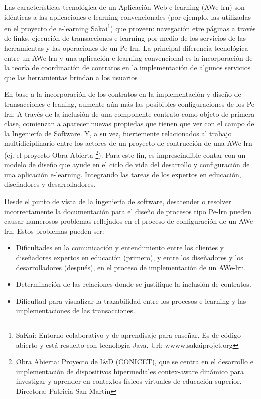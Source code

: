 \documentclass[12 pt,a4paper]{llncs}
\begin{document}
Las características tecnológica de un Aplicación Web e-learning (AWe-lrn) son idénticas a las aplicaciones e-learning convencionales (por ejemplo, las utilizadas en el proyecto de e-learning Sakai\footnote{SaKai: Entorno colaborativo y de aprendisaje para enseñar. Es de código abierto y está resuelto con tecnología Java. Url: wwww.sakaiprojet.org}) que proveen:  navegación etre páginas a través de links, ejecución de transacciones e-learning por medio de los servicios de las herramientas y las operaciones de un Pe-lrn. La principal diferencia tecnológica entre un AWe-lrn y una aplicación e-learning convencional es la incorporación de la teoría de coordinación de contratos \cite{fiadeiro,libro5} en la implementación de algunos servicios que las herramientas brindan a los usuarios \cite{libro}.

En base a la incorporación de los contratos en la implementación y diseño de transacciones e-leaning, aumente aún más las posibibles configuraciones de los Pe-lrn. A través de la inclusión de una componente contrato como objeto de primera clase, comienzan a aparecer nuevas propiedas que tienen que ver con el campo de la Ingeniería de Software. Y, a su vez,  fuertemente relacionados al trabajo multidiciplinario entre los actores de un proyecto de contrucción de una AWe-lrn (ej. el proyecto Obra Abierta \footnote{Obra Abierta: Proyecto de I&D (CONICET), que se centra en el desarrollo e implementación de dispositivos hipermediales contex-aware dinámico para investigar y aprender en contextos físicos-virtuales de educación superior. Directora: Patricia San Martín }). Para este fin, es imprescindible contar con un modelo de diseño que ayude en el ciclo de vida del desarrollo y configuración de una aplicación e-learning. Integrando las tareas de los expertos en educación, diseñadores y desarrolladores.

Desde el punto de vista de la ingeniería de software, desatender o resolver incorrectamente la documentación para el diseño de procesos tipo Pe-lrn pueden causar numerosos problemas reflejados en el proceso de configuración  de un AWe-lrn. Estos problemas pueden ser:


\begin{itemize}
	\item Dificultades en la comunicación y entendimiento entre los clientes y diseñadores expertos en educación (primero), y entre los diseñadores y los desarrolladores (después), en el proceso de implementación de un AWe-lrn.

	\item Determinación de las relaciones donde se justifique la inclusión de contratos.
	
	\item Dificultad para visualizar la trazabilidad entre los procesos e-learning y las implementaciones de las transacciones.

\end{itemize}
\end{document}
